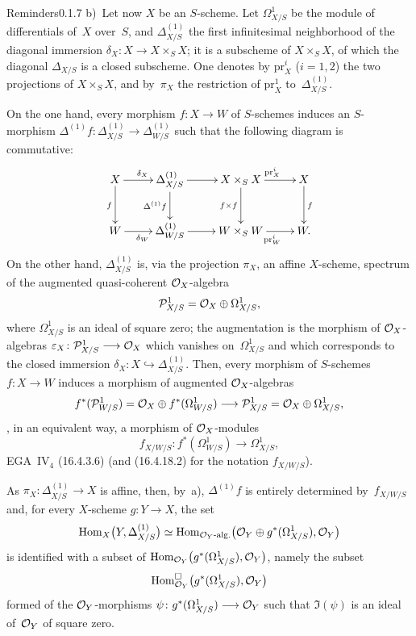 \begin{enoncerm}{Reminders}{0.1.7}
b)~Let now \(X\) be an \(S\)-scheme. Let \(\Omega^1_{X/S}\) be the module
of differentials of~\(X\) over~\(S\), and \(\Delta^{(1)}_{X/S}\) the first
infinitesimal neighborhood of the diagonal immersion
\(\delta_X\colon X\to X\times_S X\); it is a subscheme of
\(X\times_S X\), of which the diagonal \(\Delta_{X/S}\) is a closed
subscheme. One denotes by \(\mathrm{pr}^{i}_X\) (\(i=1,2\)) the two
projections of \(X\times_S X\), and by~\(\pi_X\) the restriction of
\(\mathrm{pr}^{1}_X\) to~\(\Delta^{(1)}_{X/S}\).

On the one hand, every morphism \(f\colon X\to W\) of \(S\)-schemes
induces an \(S\)-morphism
\(\Delta^{(1)}f\colon\Delta^{(1)}_{X/S}\to\Delta^{(1)}_{W/S}\) such that
the following diagram is commutative:
\[
\xymatrix{
X \ar[r]^{\delta_X} \ar[d]_{f}
  & \Delta^{(1)}_{X/S} \ar[r] \ar[d]_{\Delta^{(1)}f}
  & X\times_S X \ar[r]^{\mathrm{pr}^{i}_X} \ar[d]_{f\times f}
  & X \ar[d]^{f} \\
W \ar[r]_{\delta_W}
  & \Delta^{(1)}_{W/S} \ar[r]
  & W\times_S W \ar[r]_{\mathrm{pr}^{i}_W}
  & W.
}
\]
On the other hand, \(\Delta^{(1)}_{X/S}\) is, via the projection
\(\pi_X\), an affine \(X\)-scheme, spectrum of the augmented
quasi-coherent \(\mathcal{O}_X\)-algebra
\[
\mathcal{P}^{1}_{X/S}=\mathcal{O}_X\oplus\Omega^1_{X/S},
\]
where \(\Omega^1_{X/S}\) is an ideal of square zero; the augmentation is
the morphism of \(\mathcal{O}_X\)-algebras
\(\varepsilon_X\colon\mathcal{P}^{1}_{X/S}\longrightarrow\mathcal{O}_X\) which vanishes
on~\(\Omega^1_{X/S}\) and which corresponds to the closed immersion
\(\delta_X\colon X\hookrightarrow\Delta^{(1)}_{X/S}\). Then, every
morphism of \(S\)-schemes \(f\colon X\to W\) induces a morphism of
augmented \(\mathcal{O}_X\)-algebras
\[
f^{*}(\mathcal{P}^{1}_{W/S})
=\mathcal{O}_X\oplus f^{*}(\Omega^1_{W/S})
\longrightarrow
\mathcal{P}^{1}_{X/S}
=\mathcal{O}_X\oplus\Omega^1_{X/S},
\]
\ie, in an equivalent way, a morphism of \(\mathcal{O}_X\)-modules
\[
f_{X/W/S}\colon f^{*}(\Omega^1_{W/S})\longrightarrow\Omega^1_{X/S},
\]
\cf EGA~\(\mathrm{IV}_{4}\) (16.4.3.6) (and (16.4.18.2) for the notation
\(f_{X/W/S}\)).

As \(\pi_X\colon\Delta^{(1)}_{X/S}\to X\) is affine, then, by~a),
\(\Delta^{(1)}f\) is entirely determined by~\(f_{X/W/S}\) and, for every
\(X\)-scheme \(g\colon Y\to X\), the set
\[
\operatorname{Hom}_X\bigl(Y,\Delta^{(1)}_{X/S}\bigr)
\simeq
\operatorname{Hom}_{\mathcal{O}_Y\text{-alg.}}\bigl(\mathcal{O}_Y\oplus g^{*}(\Omega^1_{X/S}),\mathcal{O}_Y\bigr)
\]
is identified with a subset of
\(\operatorname{Hom}_{\mathcal{O}_Y}\bigl(g^{*}(\Omega^1_{X/S}),\mathcal{O}_Y\bigr)\), namely the subset
\[
\operatorname{Hom}^{\square}_{\mathcal{O}_Y}\bigl(g^{*}(\Omega^1_{X/S}),\mathcal{O}_Y\bigr)
\]
formed of the \(\mathcal{O}_Y\)-morphisms
\(\psi\colon g^{*}(\Omega^1_{X/S})\longrightarrow\mathcal{O}_Y\) such that \(\Im(\psi)\) is an ideal
of~\(\mathcal{O}_Y\) of square zero.%
{\renewcommand{\thefootnote}{(12)}}


\end{enoncerm}
